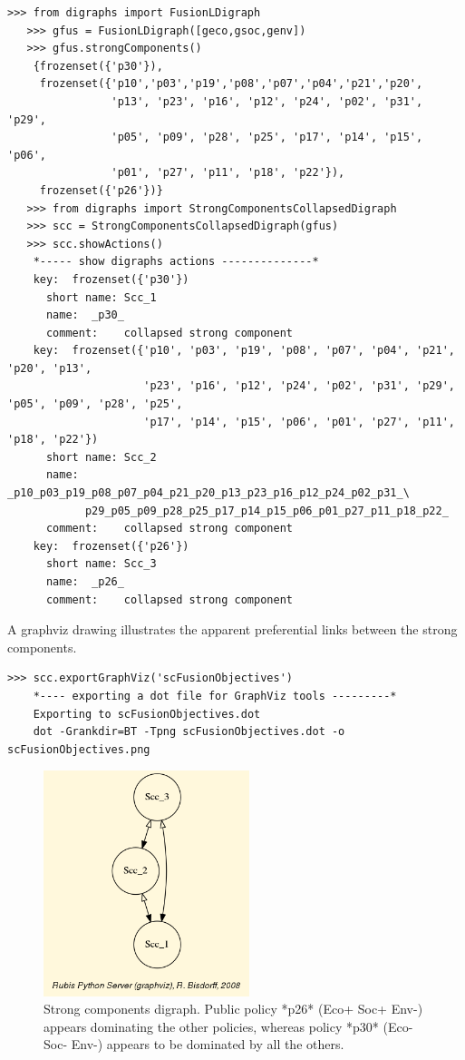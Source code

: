 \begin{lstlisting}[basicstyle=\footnotesize]
   >>> from digraphs import FusionLDigraph
   >>> gfus = FusionLDigraph([geco,gsoc,genv])
   >>> gfus.strongComponents()
    {frozenset({'p30'}), 
     frozenset({'p10','p03','p19','p08','p07','p04','p21','p20', 
                'p13', 'p23', 'p16', 'p12', 'p24', 'p02', 'p31', 'p29', 
                'p05', 'p09', 'p28', 'p25', 'p17', 'p14', 'p15', 'p06', 
                'p01', 'p27', 'p11', 'p18', 'p22'}), 
     frozenset({'p26'})}
   >>> from digraphs import StrongComponentsCollapsedDigraph
   >>> scc = StrongComponentsCollapsedDigraph(gfus)
   >>> scc.showActions()
    *----- show digraphs actions --------------*
    key:  frozenset({'p30'})
      short name: Scc_1
      name:  _p30_
      comment:    collapsed strong component
    key:  frozenset({'p10', 'p03', 'p19', 'p08', 'p07', 'p04', 'p21', 'p20', 'p13', 
                     'p23', 'p16', 'p12', 'p24', 'p02', 'p31', 'p29', 'p05', 'p09', 'p28', 'p25', 
                     'p17', 'p14', 'p15', 'p06', 'p01', 'p27', 'p11', 'p18', 'p22'})
      short name: Scc_2
      name: _p10_p03_p19_p08_p07_p04_p21_p20_p13_p23_p16_p12_p24_p02_p31_\
            p29_p05_p09_p28_p25_p17_p14_p15_p06_p01_p27_p11_p18_p22_
      comment:    collapsed strong component
    key:  frozenset({'p26'})
      short name: Scc_3
      name:  _p26_
      comment:    collapsed strong component
    \end{lstlisting}

A graphviz drawing illustrates the apparent preferential links between the strong components.

\begin{lstlisting}[basicstyle=\footnotesize]
   >>> scc.exportGraphViz('scFusionObjectives')
    *---- exporting a dot file for GraphViz tools ---------*
    Exporting to scFusionObjectives.dot
    dot -Grankdir=BT -Tpng scFusionObjectives.dot -o scFusionObjectives.png
  \end{lstlisting}

\begin{figure}[h]
\sidecaption
\includegraphics[width=6cm]{Figures/sccFusionObjectives.png}
\caption{Strong components digraph. Public policy *p26* (Eco+ Soc+ Env-) appears dominating the other policies, whereas policy *p30* (Eco- Soc- Env-) appears to be dominated by all the others.}
\label{fig:5.3}       %
\end{figure}
	   


